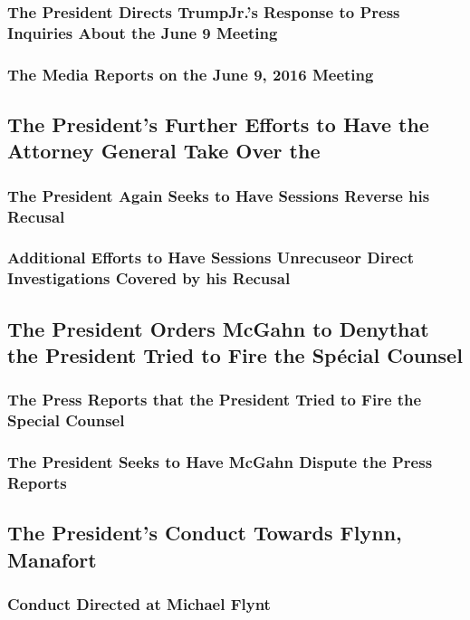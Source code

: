 \subsubsection{The President Directs TrumpJr.’s Response to Press Inquiries About the June 9 Meeting}

\subsubsection{The Media Reports on the June 9, 2016 Meeting}

\subsection{The President’s Further Efforts to Have the Attorney General Take Over the }

\subsubsection{The President Again Seeks to Have Sessions Reverse his Recusal}

\subsubsection{Additional Efforts to Have Sessions Unrecuseor Direct Investigations Covered by his Recusal}

\subsection{The President Orders McGahn to Denythat the President Tried to Fire the Spécial Counsel}

\subsubsection{The Press Reports that the President Tried to Fire the Special Counsel}

\subsubsection{The President Seeks to Have McGahn Dispute the Press Reports}

\subsection{The President’s Conduct Towards Flynn, Manafort}

\subsubsection{Conduct Directed at Michael Flynt}


